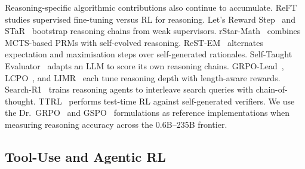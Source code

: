\documentclass{article}
\begin{document}
Reasoning-specific algorithmic contributions also continue to accumulate.
ReFT~\cite{luong2024reft} studies supervised fine-tuning versus RL for
reasoning. Let's Reward Step~\cite{zhang2025rewardstep} and
STaR~\cite{zelikman2022star} bootstrap reasoning chains from weak
supervisors. rStar-Math~\cite{guan2025rstarmath} combines MCTS-based PRMs
with self-evolved reasoning. ReST-EM~\cite{singh2024restem} alternates
expectation and maximisation steps over self-generated rationales.
Self-Taught Evaluator~\cite{wang2024stevaluator} adapts an LLM to score its
own reasoning chains. GRPO-Lead~\cite{lu2025grpolead}, LCPO~\cite{lu2025lcpo},
and LIMR~\cite{li2025limr} each tune reasoning depth with length-aware
rewards. Search-R1~\cite{jin2025searchr1} trains reasoning agents to
interleave search queries with chain-of-thought. TTRL~\cite{pu2025ttrl}
performs test-time RL against self-generated verifiers. We use the
Dr.~GRPO~\cite{tong2025drgrpo} and GSPO~\cite{qwen2025gspo} formulations as
reference implementations when measuring reasoning accuracy across the
0.6B--235B frontier.

\subsection{Tool-Use and Agentic RL}
\label{sec:related:tooluse}
\end{document}
